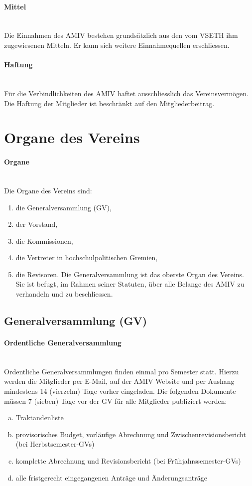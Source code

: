 \documentclass[a4paper,11pt]{article}
\begin{document}
\paragraph{Mittel} \ \\
Die Einnahmen des AMIV bestehen grundsätzlich aus den vom VSETH ihm zugewiesenen Mitteln. Er kann sich weitere Einnahmequellen erschliessen.


\paragraph{Haftung} \ \\
Für die Verbindlichkeiten des AMIV haftet ausschliesslich das Vereinsvermögen. Die Haftung der Mitglieder ist beschränkt auf den Mitgliederbeitrag.



\section{Organe des Vereins}
\paragraph{Organe}\label{Organe} \ \\
Die Organe des Vereins sind:
\begin{enumerate}
  \item die Generalversammlung (GV),
  \item der Vorstand,
  \item die Kommissionen,
  \item die Vertreter in hochschulpolitischen Gremien,
  \item die Revisoren.
  Die Generalversammlung ist das oberste Organ des Vereins. Sie ist befugt, im Rahmen seiner Statuten, über alle Belange des AMIV zu verhandeln und zu beschliessen.
\end{enumerate}


\subsection{Generalversammlung (GV)}
\paragraph{Ordentliche Generalversammlung} \label{Ordentliche_Generalversammlung} \ \\
Ordentliche Generalversammlungen finden einmal pro Semester statt. Hierzu werden die Mitglieder per E-Mail, auf der AMIV Website und per Aushang mindestens 14 (vierzehn) Tage vorher eingeladen. Die folgenden Dokumente müssen 7 (sieben) Tage vor der GV für alle Mitglieder publiziert werden:
\begin{enumerate}[(a)]
    \item Traktandenliste
    \item provisorisches Budget, vorläufige Abrechnung und Zwischenrevisionsbericht (bei Herbstsemester-GVs)
    \item komplette Abrechnung und Revisionsbericht (bei Frühjahrssemester-GVs)
    \item alle fristgerecht eingegangenen Anträge und Änderungsanträge
\end{enumerate}
\end{document}
